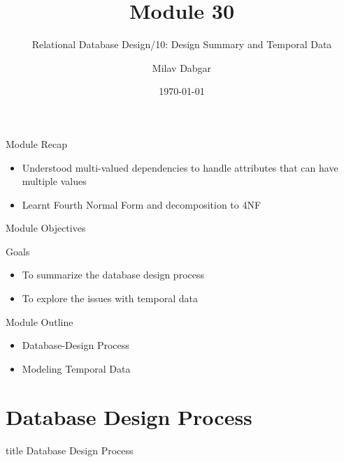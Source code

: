 \documentclass[aspectratio=169, xcolor=dvipsnames]{beamer}
\title{Module 30}
\subtitle{Relational Database Design/10: Design Summary and Temporal Data}
\author{Milav Dabgar}
\institute{www.milav.in}
\date{\today}
\begin{document}
\begin{frame}
    \titlepage
\end{frame}

\begin{frame}{Module Recap}
    \begin{itemize}[<+->]
        \item Understood multi-valued dependencies to handle attributes that can have multiple values
        \item Learnt Fourth Normal Form and decomposition to 4NF
    \end{itemize}
\end{frame}

\begin{frame}{Module Objectives}
    \begin{block}{Goals}
        \begin{itemize}[<+->]
            \item To summarize the database design process
            \item To explore the issues with temporal data
        \end{itemize}
    \end{block}
\end{frame}

\begin{frame}{Module Outline}
    \begin{itemize}[<+->]
        \item Database-Design Process
        \item Modeling Temporal Data
    \end{itemize}
\end{frame}

\section{Database Design Process}
\begin{frame}
  \vfill
  \centering
  \begin{beamercolorbox}[sep=8pt,center,shadow=true,rounded=true]{title}
    Database Design Process\par%
  \end{beamercolorbox}
  \vfill
\end{frame}
\end{document}
